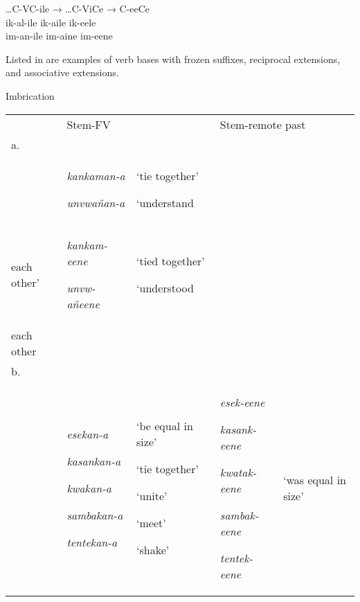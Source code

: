 \documentclass[output=paper]{langsci/langscibook}
\begin{document}
\ea
 …C-VC-ile  →  …C-ViCe  →  C-eeCe   \\
\gll ik-al-ile        ik-aile    ik-eele\\
 im-an-ile        im-aine    im-eene\\
\z

Listed in  are examples of verb bases with frozen suffixes, reciprocal extensions, and associative extensions.

\begin{table}
\caption{Imbrication}
\label{tab:20}
\end{table}

\begin{tabular}{lllll} & \multicolumn{2}{l}{\mdseries Stem-FV} & \multicolumn{2}{l}{\mdseries Stem-remote past}\\
\lsptoprule
\mdseries a. \\ & {\mdseries \emph{kankaman-a}}

\mdseries \emph{unvwañan-a} & {\mdseries ‘tie together’}

\mdseries ‘understand\\
  each other’ & {\mdseries \emph{kankam-eene}}

\mdseries \emph{unvw-añeene} & {\mdseries ‘tied together’}

\mdseries ‘understood\\
  each other\\
\mdseries b.\\ & {\mdseries \emph{esekan-a}}

{\mdseries \emph{kasankan-a}}

{\mdseries \emph{kwakan-a}}

{\mdseries \emph{sambakan-a}}

\mdseries \emph{tentekan-a} & {\mdseries ‘be equal in size’}

{\mdseries ‘tie together’}

{\mdseries ‘unite’}

{\mdseries ‘meet’}

\mdseries ‘shake’ & {\mdseries \emph{esek-eene}}

{\mdseries \emph{kasank-eene}}

{\mdseries \emph{kwatak-eene}}

{\mdseries \emph{sambak-eene}}

\mdseries \emph{tentek-eene} & {\mdseries ‘was equal in size’}


\end{tabular}
\end{document}
